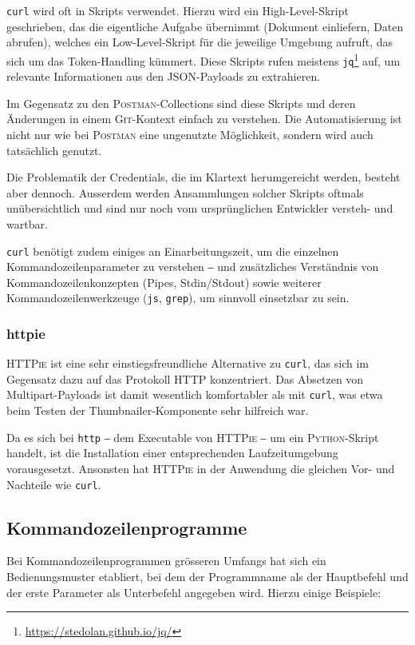 \texttt{curl} wird oft in Skripts verwendet. Hierzu wird ein High-Level-Skript geschrieben, das die eigentliche Aufgabe übernimmt (Dokument einliefern, Daten abrufen), welches ein Low-Level-Skript für die jeweilige Umgebung aufruft, das sich um das Token-Handling kümmert. Diese Skripts rufen meistens \texttt{jq}\footnote{\url{https://stedolan.github.io/jq/}} auf, um relevante Informationen aus den JSON-Payloads zu extrahieren.

Im Gegensatz zu den \textsc{Postman}-Collections sind diese Skripts und deren Änderungen in einem \textsc{Git}-Kontext einfach zu verstehen. Die Automatisierung ist nicht nur wie bei \textsc{Postman} eine ungenutzte Möglichkeit, sondern wird auch tatsächlich genutzt.

Die Problematik der Credentials, die im Klartext herumgereicht werden, besteht aber dennoch. Ausserdem werden Ansammlungen solcher Skripts oftmals unübersichtlich und sind nur noch vom ursprünglichen Entwickler versteh- und wartbar.

\texttt{curl} benötigt zudem einiges an Einarbeitungszeit, um die einzelnen Kommandozeilenparameter zu verstehen ‒ und zusätzliches Verständnis von Kommandozeilenkonzepten (Pipes, Stdin/Stdout) sowie weiterer Kommandozeilenwerkzeuge (\texttt{js}, \texttt{grep}), um sinnvoll einsetzbar zu sein.

\subsubsection{httpie}

\textsc{HTTPie} ist eine sehr einstiegsfreundliche Alternative zu \texttt{curl}, das sich im Gegensatz dazu auf das Protokoll HTTP konzentriert. Das Absetzen von Multipart-Payloads ist damit wesentlich komfortabler als mit \texttt{curl}, was etwa beim Testen der Thumbnailer-Komponente sehr hilfreich war.

Da es sich bei \texttt{http} ‒ dem Executable von \textsc{HTTPie} ‒ um ein \textsc{Python}-Skript handelt, ist die Installation einer entsprechenden Laufzeitumgebung vorausgesetzt. Ansonsten hat \textsc{HTTPie} in der Anwendung die gleichen Vor- und Nachteile wie \texttt{curl}.

\subsection{Kommandozeilenprogramme}

Bei Kommandozeilenprogrammen grösseren Umfangs hat sich ein Bedienungsmuster etabliert, bei dem der Programmname als der Hauptbefehl und der erste Parameter als Unterbefehl angegeben wird. Hierzu einige Beispiele:

